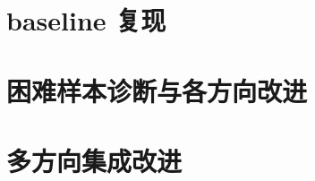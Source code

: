\documentclass[11pt]{ctexart}
\begin{document}
\section*{baseline 复现}


\section*{困难样本诊断与各方向改进}


\section*{多方向集成改进}

\end{document}
